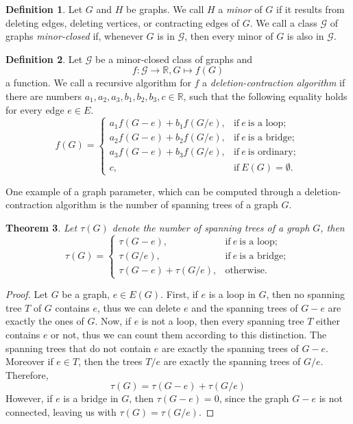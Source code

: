 \documentclass[12pt,a4paper, twoside, autooneside=false]{scrartcl}
\newtheorem{theorem}{Theorem}[section]
\theoremstyle{definition}
\newtheorem{definition}[theorem]{Definition}
\theoremstyle{remark}
\numberwithin{equation}{section}
\begin{document}
\begin{definition}
Let $G$ and $H$ be graphs. We call $H$ a \textit{minor} of $G$ if it results from deleting edges, deleting vertices, or contracting edges of $G$. We call a class $\mathcal{G}$ of graphs \textit{minor-closed} if, whenever $G$ is in $\mathcal{G}$, then every minor of $G$ is also in $\mathcal{G}$. 
\end{definition}
\begin{definition}
Let $\mathcal{G}$ be a minor-closed class of graphs and 
\[
f : \mathcal{G} \to \mathbb{R}, G \mapsto f(G)
\]
a function. We call a recursive algorithm for $f$ a \textit{deletion-contraction algorithm} if there are numbers $a_1, a_2, a_3, b_1, b_2, b_3, c \in \mathbb{R}$, such that the following equality holds for every edge $e \in E$.
\[
f(G) = \begin{cases}
a_1f(G - e) + b_1 f(G / e), & \text{if} \ e \ \text{is a loop} ; \\
a_2f(G - e) + b_2 f(G / e), &  \text{if} \ e \ \text{is a bridge}; \\
a_3f(G - e) + b_3 f(G / e), & \text{if} \ e \ \text{is ordinary}; \\
c, & \text{if} \ E(G) = \emptyset .
\end{cases}
\]
\end{definition}
One example of a graph parameter, which can be computed through a deletion-contraction algorithm is the number of spanning trees of a graph $G$.   
\begin{theorem}
Let $\tau(G)$ denote the number of spanning trees of a graph $G$, then 
\[
\tau(G) = \begin{cases}
\tau(G - e), & \text{if} \  e \ \text{is a loop}; \\
\tau(G / e), & \text{if} \ e \ \text{is a bridge}; \\
\tau(G -  e) + \tau(G/e), & \text{otherwise.}
\end{cases}
\]
\end{theorem}
\begin{proof} 
Let $G$ be a graph, $e \in E(G)$. First, if $e$ is a loop in $G$, then no spanning tree $T$ of $G$ contains $e$, thus we can delete $e$ and the spanning trees of $G - e$ are exactly the ones of $G$. Now, if $e$ is not a loop, then every spanning tree $T$ either contains $e$ or not, thus we can count them according to this distinction. The spanning trees that do not contain $e$ are exactly the spanning trees of $G - e$. Moreover if $e \in T$, then the trees $T / e$ are exactly the spanning trees of $G / e$. Therefore, 
\[
\tau(G) = \tau(G - e) + \tau(G/ e)
\]
However, if $e$ is a bridge in $G$, then $\tau(G - e) = 0$, since the graph $G - e$ is not connected, leaving us with $\tau(G) = \tau(G / e)$. 
\end{proof}
\end{document}

